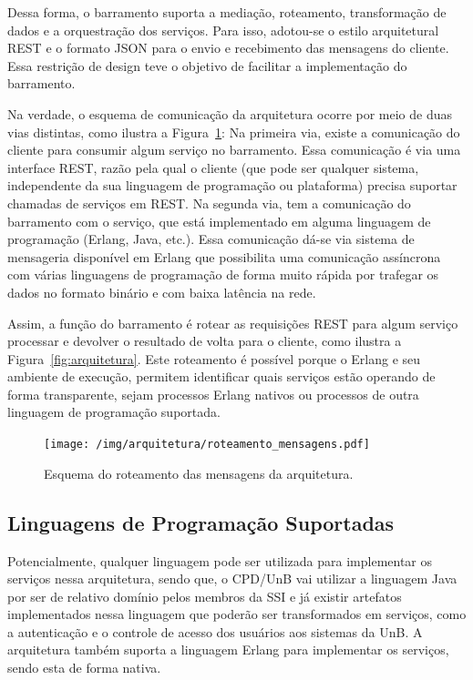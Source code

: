 Dessa forma, o barramento suporta a mediação, roteamento, 
transformação de dados e a orquestração dos serviços. Para isso, adotou-se o 
estilo arquitetural \acrshort{REST} e o formato \acrshort{JSON} para o envio e 
recebimento das mensagens do cliente. Essa restrição de design teve o 
objetivo de facilitar a 
implementação do barramento. 

Na verdade, o esquema de comunicação da arquitetura ocorre por meio de 
duas vias distintas, como ilustra a Figura~\ref{fig:roteamento_mensagens}: Na primeira via, 
existe a comunicação do cliente para 
consumir algum serviço no barramento. Essa comunicação é via uma 
interface \acrshort{REST}, razão pela qual o cliente (que pode ser qualquer sistema, 
independente da sua linguagem de programação ou plataforma) 
precisa suportar chamadas de serviços em \acrshort{REST}. Na segunda via, tem a comunicação 
do barramento com o serviço, que está implementado em 
alguma linguagem de programação (Erlang, Java, etc.). Essa comunicação dá-se via
sistema de mensageria disponível
em Erlang que possibilita uma comunicação assíncrona 
com várias linguagens de programação de forma muito rápida por trafegar os dados 
no formato binário e com baixa latência na rede\cite{Armstrong:2013:PES:2566708}.

Assim, a função do barramento é rotear as requisições \acrshort{REST} para algum serviço processar 
e devolver o resultado de volta para o cliente, como ilustra a Figura~\ref{fig:arquitetura}. Este roteamento é possível porque o Erlang e seu ambiente de execução, permitem identificar quais serviços estão operando de forma transparente, sejam processos Erlang nativos ou processos de outra linguagem de programação suportada. 

\begin{figure}[htb]
\centering
\texttt{[image: /img/arquitetura/roteamento\_mensagens.pdf]}
\caption{Esquema do roteamento das mensagens da arquitetura.}
\label{fig:roteamento_mensagens}
\end{figure}
\FloatBarrier



\subsection{Linguagens de Programação Suportadas}\label{ling_suportada}

Potencialmente, qualquer linguagem pode ser utilizada para implementar os 
serviços nessa arquitetura, sendo que, o CPD/UnB vai utilizar a linguagem Java 
por ser de relativo domínio pelos membros da \acrshort{SSI} e já existir artefatos 
implementados nessa linguagem que poderão ser transformados em serviços, 
como a autenticação e o controle de acesso dos usuários aos sistemas da \acrshort{UnB}. A
arquitetura também suporta a linguagem Erlang para implementar os serviços, sendo esta
de forma nativa.

